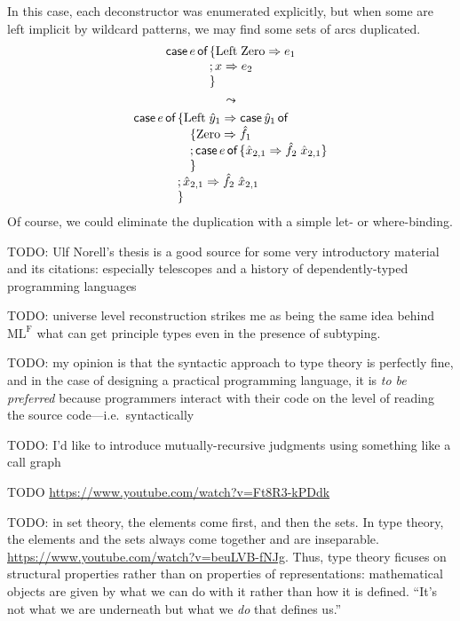 \documentclass[11pt]{article} %
\theoremstyle{definition}
\theoremstyle{remark}
\begin{document}
In this case, each deconstructor was enumerated explicitly, but when some are left implicit by wildcard patterns, we may find some sets of arcs duplicated.
\[\begin{array}{l}
  \caseof{e} \{            \textrm{Left}\;\textrm{Zero} \To e_1 \\
    \hphantom{\caseof{e}\mathstrut}; x \To e_2 \\
    \hphantom{\caseof{e}\mathstrut}\}
\end{array}\]
$$\leadsto$$
\[\begin{array}{l}
  \caseof{e} \{                    \textrm{Left}\;\hat y_1 \To \caseof{\hat y_1} \\
      \hphantom{\caseof{e}\mathstrut}\quad\{ \textrm{Zero} \To \hat f_1 \\
      \hphantom{\caseof{e}\mathstrut}\quad;  \caseof{e}\{\hat x_{2,1} \To \hat f_2\;\hat x_{2,1}\} \\
      \hphantom{\caseof{e}\mathstrut}\quad\} \\
    \hphantom{\caseof{e}\mathstrut}; \hat x_{2,1} \To \hat f_2\;\hat x_{2,1} \\
    \hphantom{\caseof{e}\mathstrut}\}
\end{array}\]
Of course, we could eliminate the duplication with a simple let- or where-binding.

TODO: Ulf Norell's thesis is a good source for some very introductory material and its citations: especially telescopes and a history of dependently-typed programming languages

TODO: universe level reconstruction strikes me as being the same idea behind $\mathrm{ML^F}$ what can get principle types even in the presence of subtyping.

TODO: my opinion is that the syntactic approach to type theory is perfectly fine, and in the case of designing a practical programming language, it is \emph{to be preferred} because programmers interact with their code on the level of reading the source code---i.e.\ syntactically

TODO: I'd like to introduce mutually-recursive judgments using something like a call graph

TODO \url{https://www.youtube.com/watch?v=Ft8R3-kPDdk}

TODO: in set theory, the elements come first, and then the sets. In type theory, the elements and the sets always come together and are inseparable. \url{https://www.youtube.com/watch?v=beuLVB-fNJg}. Thus, type theory ficuses on structural properties rather than on properties of representations: mathematical objects are given by what we can do with it rather than how it is defined. ``It's not what we are underneath but what we \emph{do} that defines us.''
\end{document}
